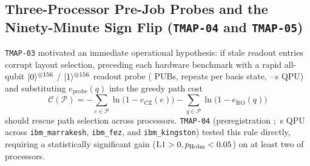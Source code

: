 \documentclass[twocolumn,aps,prapplied,superscriptaddress,floatfix]{revtex4-2}
\begin{document}
\subsection{Three-Processor Pre-Job Probes and the Ninety-Minute Sign Flip (\texttt{TMAP-04} and \texttt{TMAP-05})}

\texttt{TMAP-03} motivated an immediate operational hypothesis: if stale readout entries corrupt layout selection, preceding each hardware benchmark with a rapid all-qubit $|0\rangle^{\otimes 156}$ / $|1\rangle^{\otimes 156}$ readout probe (\TmapProbePubs{} PUBs, \ProbeRepeats{} repeats per basis state, \TmapProbeSecLow{}--\TmapProbeSecHigh{}\,s QPU) and substituting $e_{\mathrm{probe}}(q)$ into the greedy path cost
\begin{equation}
\mathcal{C}(\mathcal{P}) = -\sum_{e \in \mathcal{P}} \ln\!\bigl(1 - e_{\mathrm{CZ}}(e)\bigr) - \sum_{q \in \mathcal{P}} \ln\!\bigl(1 - e_{\mathrm{RO}}(q)\bigr)
\label{eq:path_cost}
\end{equation}
should rescue path selection across processors. \texttt{TMAP-04} (preregistration \texttt{\DoiTmapFourPrereg}; \TmapFourTotalSeconds{}\,s QPU across \texttt{ibm\_marrakesh}, \texttt{ibm\_fez}, and \texttt{ibm\_kingston}) tested this rule directly, requiring a statistically significant gain ($\mathrm{L1}>0, p_{\mathrm{Holm}}<0.05$) on at least two of \NumBackends{} processors.
\end{document}
